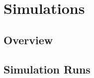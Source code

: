 \chapter{Simulations}\label{sec:simulations}

\section{Overview}


\section{Simulation Runs}

\clearpage


